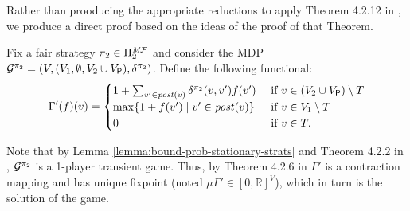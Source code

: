 \begin{myproof}
  Rather than prooducing the appropriate reductions to apply Theorem
  4.2.12 in \cite[p.~174]{FilarV96}, we produce a direct proof based
  on the ideas of the proof of that Theorem.
  
  Fix a fair strategy $\pi_{2} \in \Pi^{\textit{M}\mathcal{F}}_{2}$ and
  consider the MDP
  $\mathcal{G}^{\pi_{2}} = (V, (V_1, \emptyset, V_2 \cup V_{\mathsf{P}}), \delta^{\pi_{2}})$.
  Define the following functional:
  \[
  \Gamma'(f)(v) =
  \begin{cases}
    1 + \sum_{v' \in \mathit{post}(v)} \delta^{\pi_{2}}(v,v')  f(v') & \text{ if } v \in (V_2 \cup V_{\mathsf{P}}) \setminus T  \\
    \max \{1  + f(v') \mid v' \in \mathit{post}(v) \} & \text{ if } v \in  V_1 \setminus T \\
    0 & \text{ if } v \in T.
  \end{cases}
  \]
  
  Note that by Lemma \ref{lemma:bound-prob-stationary-strats} and Theorem 4.2.2 in \cite{FilarV96},  $\mathcal{G}^{\pi_{2}}$
  is a 1-player transient game.  Thus, by Theorem 4.2.6 in \cite{FilarV96} $\Gamma'$ is a contraction mapping and has unique fixpoint (noted $\mu \Gamma' \in [0,\mathbb{R}]^V$), which in turn is the solution of the game.
  

\end{myproof}

